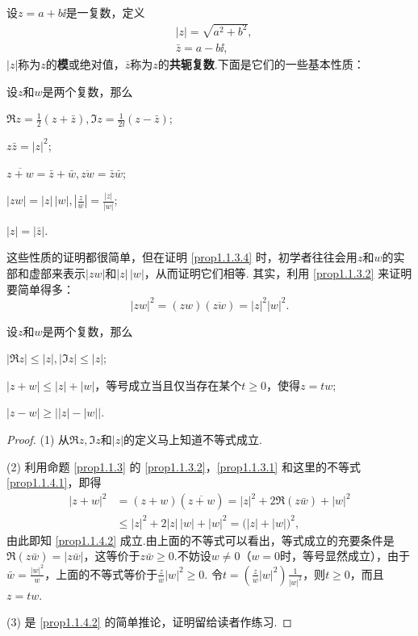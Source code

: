 设$z=a+b\ii$是一复数，定义
\begin{align*}
&|z|=\sqrt{a^2+b^2},\\
&\bar z=a-b\ii,
\end{align*}
$|z|$称为$z$的\textbf{模}或绝对值，$\bar z$称为$z$的\textbf{共轭复数}.下面是它们的一些基本性质：
\begin{prop}\label{prop1.1.3}
设$z$和$w$是两个复数，那么
\begin{eenum}
  \item $\Re z=\frac12(z+\bar z),\Im z=\frac1{2\ii}(z-\bar z)$;\label{prop1.1.3.1}
  \item $z\bar z=|z|^2$;\label{prop1.1.3.2}
  \item $\overline{z+w}=\bar z+\bar w,\overline{zw}=\bar z\bar w$;\label{prop1.1.3.3}
  \item $|zw|=|z|\,|w|,\left|\frac zw\right|=\frac{|z|}{|w|}$;\label{prop1.1.3.4}
  \item $|z|=|\bar z|$.\label{prop1.1.3.5}
\end{eenum}
\end{prop}
这些性质的证明都很简单，但在证明 \ref{prop1.1.3.4} 时，初学者往往会用$z$和$w$的实部和虚部来表示$|zw|$和$|z|\,|w|$，从而证明它们相等. 其实，利用 \ref{prop1.1.3.2} 来证明要简单得多：
\[|zw|^2=(zw)(\overline{zw})=|z|^2|w|^2.\]

\begin{prop}\label{prop1.1.4}
设$z$和$w$是两个复数，那么
\begin{eenum}
  \item $|\Re z|\le |z|,|\Im z|\le |z|$;\label{prop1.1.4.1}
  \item $|z+w|\le|z|+|w|$，等号成立当且仅当存在某个$t\ge0$，使得$z=tw$;\label{prop1.1.4.2}
  \item $|z-w|\ge\bigl||z|-|w|\bigr|$.\label{prop1.1.4.3}
\end{eenum}
\end{prop}
\begin{proof}
(1) 从$\Re z,\Im z$和$|z|$的定义马上知道不等式成立.

(2) 利用命题 \ref{prop1.1.3} 的 \ref{prop1.1.3.2}，\ref{prop1.1.3.1} 和这里的不等式 \ref{prop1.1.4.1}，即得
\begin{align*}
|z+w|^2&=(z+w)(\overline{z+w})=|z|^2+2\Re(z\bar w)+|w|^2\\
&\le|z|^2+2|z|\,|w|+|w|^2=\big(|z|+|w|\big)^2,
\end{align*}
由此即知 \ref{prop1.1.4.2} 成立.由上面的不等式可以看出，等式成立的充要条件是$\Re(z\bar w)=|z\bar w|$，这等价于$z\bar w\ge0$.不妨设$w\ne0$（$w=0$时，等号显然成立），由于$\bar w=\frac{|w|^2}{w}$，上面的不等式等价于$\frac zw|w|^2\ge0$. 令$t=\left(\frac zw|w|^2\right)\frac1{|w|^2}$，则$t\ge0$，而且$z=tw$.

(3) 是 \ref{prop1.1.4.2} 的简单推论，证明留给读者作练习.
\end{proof}


